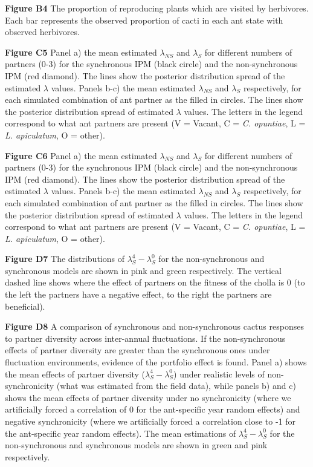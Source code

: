 \documentclass[11pt]{article}
\begin{document}
\bigskip

\textbf{Figure B4} The proportion of reproducing plants which are visited by herbivores.
Each bar represents the observed proportion of cacti in each ant state with observed herbivores.

\bigskip

\textbf{Figure C5} Panel a) the mean estimated $\lambda_{NS}$ and $\lambda_{S}$ for different numbers of partners (0-3) for the synchronous IPM (black circle) and the non-synchronous IPM (red diamond). The lines show the posterior distribution spread of the estimated $\lambda$ values. Panels b-c) the mean estimated $\lambda_{NS}$ and $\lambda_{S}$ respectively, for each simulated combination of ant partner as the filled in circles. The lines show the posterior distribution spread of estimated $\lambda$ values. The letters in the legend correspond to what ant partners are present (V = Vacant, C = \textit{C. opuntiae}, L = \textit{L. apiculatum}, O = other).


\bigskip

\textbf{Figure C6} Panel a) the mean estimated $\lambda_{NS}$ and $\lambda_{S}$ for different numbers of partners (0-3) for the synchronous IPM (black circle) and the non-synchronous IPM (red diamond). The lines show the posterior distribution spread of the estimated $\lambda$ values. Panels b-c) the mean estimated $\lambda_{NS}$ and $\lambda_{S}$ respectively, for each simulated combination of ant partner as the filled in circles. The lines show the posterior distribution spread of estimated $\lambda$ values. The letters in the legend correspond to what ant partners are present (V = Vacant, C = \textit{C. opuntiae}, L = \textit{L. apiculatum}, O = other).

\bigskip

\textbf{Figure D7} The distributions of $\lambda_{S}^4-\lambda_{S}^0$ for the non-synchronous and synchronous models are shown in pink and green respectively. The vertical dashed line shows where the effect of partners on the fitness of the cholla is 0 (to the left the partners have a negative effect, to the right the partners are beneficial).

\bigskip

\textbf{Figure D8}  A comparison of synchronous and non-synchronous cactus responses to partner diversity across inter-annual fluctuations. 
If the non-synchronous effects of partner diversity are greater than the synchronous ones under fluctuation environments, evidence of the portfolio effect is found.
Panel a) shows the mean effects of partner diversity ($\lambda_{S}^4-\lambda_{S}^0$) under realistic levels of non-synchronicity (what was estimated from the field data), while panels b) and c) shows the mean effects of partner diversity under no synchronicity (where we artificially forced a correlation of 0 for the ant-specific year random effects) and negative synchronicity (where we artificially forced a correlation close to -1 for the ant-specific year random effects).
The mean estimations of $\lambda_{S}^4-\lambda_{S}^0$ for the non-synchronous and synchronous models are shown in green and pink respectively. 
\end{document}
